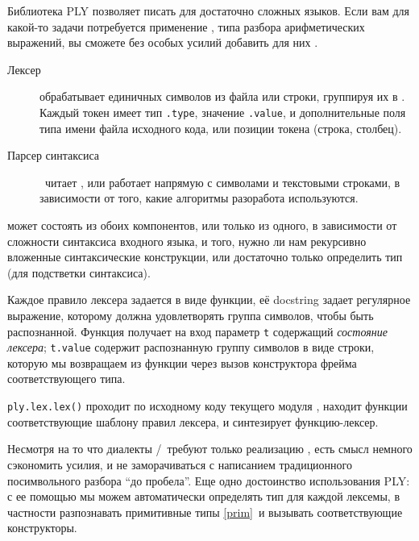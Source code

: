 \label{ply}\secdown

\clearpage
Библиотека PLY позволяет писать  для достаточно сложных языков.
Если вам для какой-то задачи потребуется применение , типа разбора арифметических выражений, вы сможете без особых усилий
добавить для них .

\begin{description}
\item[Лексер] обрабатывает  единичных символов из файла или
строки, группируя их в . Каждый токен имеет тип \verb|.type|,
значение \verb|.value|, и дополнительные поля типа имени файла исходного кода,
или позиции токена (строка, столбец).
\item[Парсер синтаксиса]\ читает , или работает напрямую с
символами и текстовыми строками, в зависимости от того, какие алгоритмы
разоработа используются.
\end{description}

\clearpage
{}

 может состоять из обоих компонентов, или только из одного, в
зависимости от сложности синтаксиса входного языка, и того, нужно ли нам
 рекурсивно вложенные синтаксические конструкции, или
достаточно только определить тип  (для подстветки синтаксиса).

\clearpage
Каждое правило лексера задается в виде функции, её docstring задает регулярное
выражение, которому должна удовлетворять группа символов, чтобы быть
распознанной. Функция получает на вход параметр \verb|t| содержащий
\textit{состояние лексера}; \verb|t.value| содержит распознанную группу символов
в виде строки, которую мы возвращаем из функции через вызов конструктора фрейма
соответствующего типа.

\bigskip
\noindent
\verb|ply.lex.lex()| проходит по исходному коду текущего модуля \py, находит
функции соответствующие шаблону правил лексера, и синтезирует функцию-лексер.



\label{plyforth}

Несмотря на то что диалекты \F/\pyf\ требуют только реализацию ,
есть смысл немного сэкономить усилия, и не заморачиваться с написанием
традиционного посимвольного разбора ``до пробела''. Еще одно достоинство
использования PLY: с ее помощью мы можем автоматически определять тип для каждой
лексемы, в частности разпознавать примитивные типы \ref{prim}\ и вызывать
соответствующие конструкторы.

